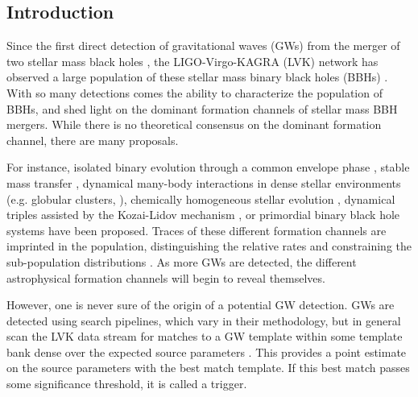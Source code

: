 \begin{refsection}
\section{Introduction}

Since the first direct detection of gravitational waves (GWs) from the merger of two stellar mass black holes \citep{2016PhRvL.116f1102A}, the LIGO-Virgo-KAGRA (LVK) network has observed a large population of these stellar mass binary black holes (BBHs) \citep{2019PhRvX...9c1040A,2021arXiv210801045T,2021arXiv211103606T}. With so many detections comes the ability to characterize the population of BBHs, and shed light on the dominant formation channels of stellar mass BBH mergers. While there is no theoretical consensus on the dominant formation channel, there are many proposals. 

For instance, isolated binary evolution through a common envelope phase \citep{1976IAUS...73...35V, 1976ApJ...207..574S,1993MNRAS.260..675T, 2013A&ARv..21...59I}, stable mass transfer \citep{2017MNRAS.471.4256V}, dynamical many-body interactions in dense stellar environments (e.g. globular clusters, \citealp{1993Natur.364..423S,1993Natur.364..421K,2000ApJ...528L..17P}), chemically homogeneous stellar evolution \citep{2016A&A...588A..50M, 2016MNRAS.458.2634M}, dynamical triples assisted by the Kozai-Lidov mechanism \citep{2017ApJ...841...77A, 2017ApJ...836...39S}, or primordial binary black hole systems \citep{2016PhRvL.116t1301B,2017PhRvD..96l3523A} have been proposed. Traces of these different formation channels are imprinted in the population, distinguishing the relative rates and constraining the sub-population distributions \citep{2021ApJ...910..152Z, 2021hgwa.bookE..16M, 2022LRR....25....1M}. As more GWs are detected, the different astrophysical formation channels will begin to reveal themselves. 

However, one is never sure of the origin of a potential GW detection. GWs are detected using search pipelines, which vary in their methodology, but in general scan the LVK data stream for matches to a GW template within some template bank dense over the expected source parameters \citep{2005PhRvD..71f2001A,2016CQGra..33u5004U,2017ApJ...849..118N,2017PhRvD..95d2001M,2020PhRvD.101b2003H}. This provides a point estimate on the source parameters with the best match template. If this best match passes some significance threshold, it is called a trigger.


\end{refsection}
